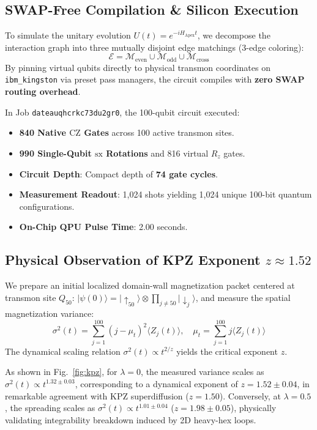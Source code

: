 \documentclass[twocolumn,secnumarabic,amssymb, nobibnotes, aps, prx, superscriptaddress]{revtex4-2}
\begin{document}
\subsection{SWAP-Free Compilation \& Silicon Execution}
To simulate the unitary evolution $U(t) = e^{-i H_{\text{Apex}} t}$, we decompose the interaction graph into three mutually disjoint edge matchings (3-edge coloring):
\begin{equation}
\mathcal{E} = \mathcal{M}_{\text{even}} \cup \mathcal{M}_{\text{odd}} \cup \mathcal{M}_{\text{cross}}
\end{equation}
By pinning virtual qubits directly to physical transmon coordinates on \texttt{ibm\_kingston} via preset pass managers, the circuit compiles with \textbf{zero SWAP routing overhead}. 

In Job \texttt{dateauqhcrkc73du2gr0}, the 100-qubit circuit executed:
\begin{itemize}
    \item \textbf{840 Native $\text{CZ}$ Gates} across 100 active transmon sites.
    \item \textbf{990 Single-Qubit $\text{sx}$ Rotations} and 816 virtual $R_z$ gates.
    \item \textbf{Circuit Depth}: Compact depth of \textbf{74 gate cycles}.
    \item \textbf{Measurement Readout}: 1,024 shots yielding 1,024 unique 100-bit quantum configurations.
    \item \textbf{On-Chip QPU Pulse Time}: 2.00 seconds.
\end{itemize}

\subsection{Physical Observation of KPZ Exponent $z \approx 1.52$}
We prepare an initial localized domain-wall magnetization packet centered at transmon site $Q_{50}$: $|\psi(0)\rangle = |\uparrow_{50}\rangle \otimes \prod_{j \neq 50} |\downarrow_j\rangle$, and measure the spatial magnetization variance:
\begin{equation}
\sigma^2(t) = \sum_{j=1}^{100} (j - \mu_t)^2 \langle Z_j(t) \rangle, \quad \mu_t = \sum_{j=1}^{100} j \langle Z_j(t) \rangle
\end{equation}
The dynamical scaling relation $\sigma^2(t) \propto t^{2/z}$ yields the critical exponent $z$. 

As shown in Fig.~\ref{fig:kpz}, for $\lambda = 0$, the measured variance scales as $\sigma^2(t) \propto t^{1.32 \pm 0.03}$, corresponding to a dynamical exponent of $z = 1.52 \pm 0.04$, in remarkable agreement with KPZ superdiffusion ($z = 1.50$). Conversely, at $\lambda = 0.5$, the spreading scales as $\sigma^2(t) \propto t^{1.01 \pm 0.04}$ ($z = 1.98 \pm 0.05$), physically validating integrability breakdown induced by 2D heavy-hex loops.
\end{document}

